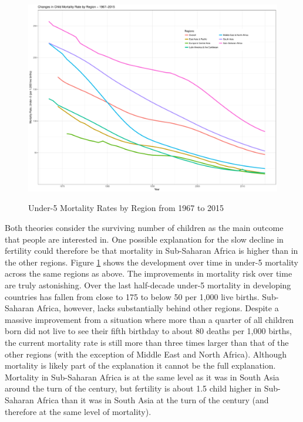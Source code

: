 \documentclass[letterpaper,12pt]{article}
\begin{document}
\begin{figure}[hp!]
    \centering
    \caption{Under-5 Mortality Rates by Region from 1967 to 2015}
    \includegraphics[width=0.75\linewidth]{childMortalityRates}
    \label{fig:mortality}
\end{figure}


Both theories consider the surviving number of children as
the main outcome that people are interested in.
One possible explanation for the slow decline in fertility
could therefore be that mortality in Sub-Saharan Africa is
higher than in the other regions.
Figure \ref{fig:mortality} shows the development over time in 
under-5 mortality across the same regions as above.
The improvements in mortality risk over time are truly astonishing.
Over the last half-decade under-5 mortality in developing countries 
has fallen from close to 175 to below 50 per 1,000 live births.
Sub-Saharan Africa, however, lacks substantially behind other regions.
Despite a massive improvement from a situation where more than a
quarter of all children born did not live to see their fifth
birthday to about 80 deaths per 1,000 births, the current mortality 
rate is still more than three times larger than that of the other 
regions (with the exception of Middle East and North Africa).
Although mortality is likely part of the explanation it cannot
be the full explanation.
Mortality in Sub-Saharan Africa is at the same level as it was
in South Asia around the turn of the century, but fertility
is about 1.5 child higher in Sub-Saharan Africa than it was
in South Asia at the turn of the century (and therefore at the
same level of mortality).
\end{document}
